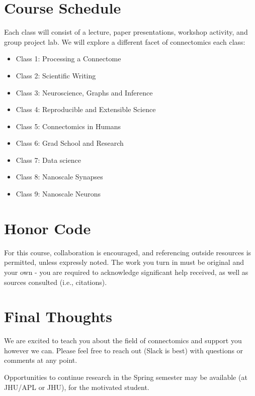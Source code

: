 \documentclass[12pt]{article}
\begin{document}
\section*{Course Schedule}
Each class will consist of a lecture, paper presentations, workshop activity, and group project lab.  We will explore a different facet of connectomics each class:
\begin{itemize}[noitemsep]
\item{Class 1:  Processing a Connectome}
\item{Class 2:  Scientific Writing}
\item{Class 3:  Neuroscience, Graphs and Inference}
\item{Class 4:  Reproducible and Extensible Science}
\item{Class 5:  Connectomics in Humans}
\item{Class 6:  Grad School and Research}
\item{Class 7:  Data science}
\item{Class 8:  Nanoscale Synapses}
\item{Class 9:  Nanoscale Neurons}
\end{itemize}
\vspace{-0.5cm}
\section*{Honor Code}
For this course, collaboration is encouraged, and referencing outside resources is permitted, unless expressly noted.  The work you turn in must be original and your own - you are required to acknowledge significant help received, as well as sources consulted (i.e., citations).  
\vspace{-0.5cm}
\section*{Final Thoughts}
We are excited to teach you about the field of connectomics and support you however we can.  Please feel free to reach out (Slack is best) with questions or comments at any point.

Opportunities to continue research in the Spring semester may be available (at JHU/APL or JHU), for the motivated student.
\end{document}
